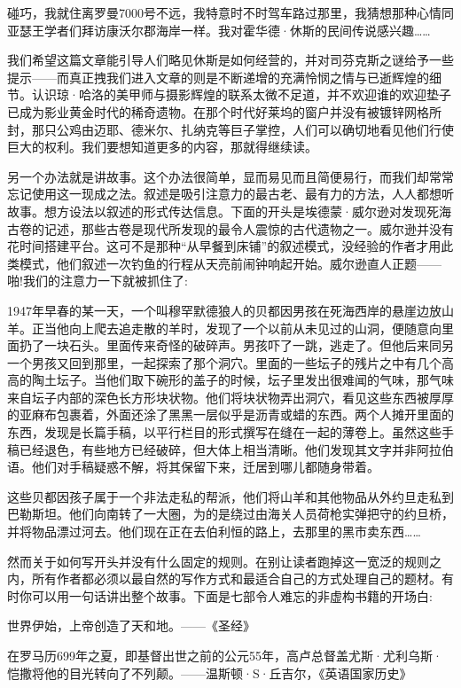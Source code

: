 碰巧，我就住离罗曼7000号不远，我特意时不时驾车路过那里，我猜想那种心情同亚瑟王学者们拜访康沃尔郡海岸一样。我对霍华德·休斯的民间传说感兴趣……

我们希望这篇文章能引导人们略见休斯是如何经营的，并对司芬克斯之谜给予一些提示——而真正拽我们进入文章的则是不断递增的充满怜悯之情与已逝辉煌的细节。认识琼·哈洛的美甲师与摄影辉煌的联系太微不足道，并不欢迎谁的欢迎垫子已成为影业黄金时代的稀奇遗物。在那个时代好莱坞的窗户并没有被镀锌网格所封，那只公鸡由迈耶、德米尔、扎纳克等巨子掌控，人们可以确切地看见他们行使巨大的权利。我们要想知道更多的内容，那就得继续读。

另一个办法就是讲故事。这个办法很简单，显而易见而且简便易行，而我们却常常忘记使用这一现成之法。叙述是吸引注意力的最古老、最有力的方法，人人都想听故事。想方设法以叙述的形式传达信息。下面的开头是埃德蒙·威尔逊对发现死海古卷的记述，那些古卷是现代所发现的最令人震惊的古代遗物之一。威尔逊并没有花时间搭建平台。这可不是那种“从早餐到床铺”的叙述模式，没经验的作者才用此类模式，他们叙述一次钓鱼的行程从天亮前闹钟响起开始。威尔逊直人正题——啪!我们的注意力一下就被抓住了:

1947年早春的某一天，一个叫穆罕默德狼人的贝都因男孩在死海西岸的悬崖边放山羊。正当他向上爬去追走散的羊时，发现了一个以前从未见过的山洞，便随意向里面扔了一块石头。里面传来奇怪的破碎声。男孩吓了一跳，逃走了。但他后来同另一个男孩又回到那里，一起探索了那个洞穴。里面的一些坛子的残片之中有几个高高的陶土坛子。当他们取下碗形的盖子的时候，坛子里发出很难闻的气味，那气味来自坛子内部的深色长方形块状物。他们将块状物弄出洞穴，看见这些东西被厚厚的亚麻布包裹着，外面还涂了黑黑一层似乎是沥青或蜡的东西。两个人摊开里面的东西，发现是长篇手稿，以平行栏目的形式撰写在缝在一起的薄卷上。虽然这些手稿已经退色，有些地方已经破碎，但大体上相当清晰。他们发现其文字并非阿拉伯语。他们对手稿疑惑不解，将其保留下来，迁居到哪儿都随身带着。

这些贝都因孩子属于一个非法走私的帮派，他们将山羊和其他物品从外约旦走私到巴勒斯坦。他们向南转了一大圈，为的是绕过由海关人员荷枪实弹把守的约旦桥，并将物品漂过河去。他们现在正在去伯利恒的路上，去那里的黑市卖东西……

然而关于如何写开头并没有什么固定的规则。在别让读者跑掉这一宽泛的规则之内，所有作者都必须以最自然的写作方式和最适合自己的方式处理自己的题材。有时你可以用一句话讲出整个故事。下面是七部令人难忘的非虚构书籍的开场白:

世界伊始，上帝创造了天和地。——《圣经》

在罗马历699年之夏，即基督出世之前的公元55年，高卢总督盖尤斯·尤利乌斯·恺撒将他的目光转向了不列颠。——温斯顿·S·丘吉尔，《英语国家历史》

